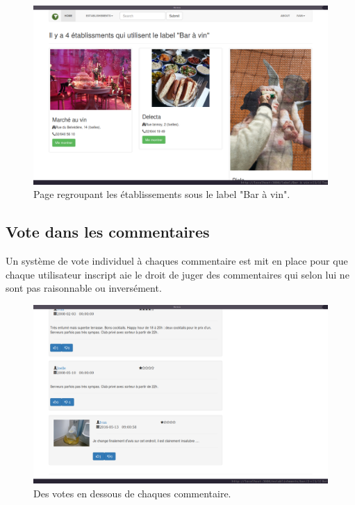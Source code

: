 \documentclass[a4paper,10pt]{article}
\begin{document}
    \begin{figure}[h]
        \centering
        \includegraphics[scale=0.3]{./images/label.png}
        \caption{Page regroupant les établissements sous le label "Bar à vin".}
    \end{figure}



\subsection{Vote dans les commentaires}
    Un système de vote individuel à chaques commentaire est mit en place pour
    que chaque utilisateur inscript aie le droit de juger des commentaires
    qui selon lui ne sont pas raisonnable ou inversément.

    \begin{figure}[h]
        \centering
        \includegraphics[scale=0.3]{./images/picture.png}
        \caption{Des votes en dessous de chaques commentaire.}
    \end{figure}
\end{document}
